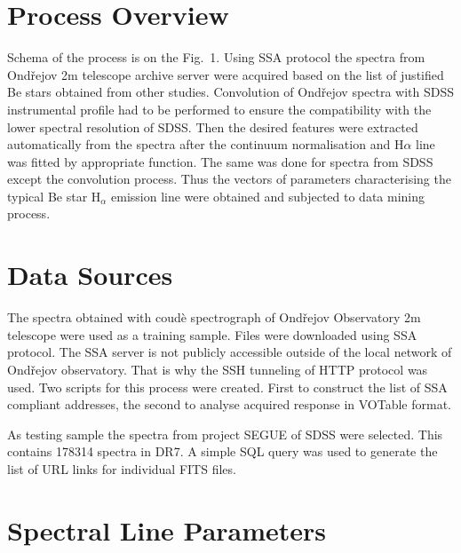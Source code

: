 \documentclass[11pt,twoside]{article}
\begin{document}
\section{Process Overview}
Schema of the process is on the Fig.~1. Using SSA protocol the spectra
from Ond\v{r}ejov 2m telescope archive server were acquired based on the list of justified Be stars
obtained from other studies.  Convolution of Ond\v{r}ejov spectra with SDSS
instrumental profile had to be performed to
ensure the compatibility with the lower spectral resolution of SDSS. 
Then the desired features were extracted automatically
from the spectra after the continuum normalisation and H$\alpha$ line
was fitted by appropriate function. The same was done for spectra from
SDSS except the convolution process. Thus the vectors of parameters
characterising the typical Be star H$_\alpha$ emission line were obtained and
subjected to data mining process.
%
%



\section{Data Sources}
The spectra obtained with coud\`e spectrograph of Ond\v{r}ejov
Observatory 2m telescope were used as a training sample. Files were
downloaded using SSA protocol. The SSA server is not publicly
accessible outside of the local network of Ond\v{r}ejov observatory.
That is why the SSH tunneling of HTTP protocol was used. Two scripts
for this process were created. First to construct the list of SSA
compliant addresses, the second to analyse acquired response in
VOTable format.

As testing sample the spectra from project SEGUE of SDSS were
selected. This contains 178314 spectra in DR7. A simple SQL query was
used to generate the list of URL links for individual FITS
files. 

\section{Spectral Line Parameters}

\end{document}
